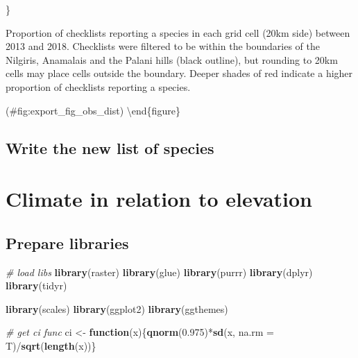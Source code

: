 \documentclass[]{article}
\newenvironment{Shaded}{}{}
\newcommand{\CommentTok}[1]{\textcolor[rgb]{0.38,0.63,0.69}{\textit{#1}}}
\newcommand{\ControlFlowTok}[1]{\textcolor[rgb]{0.00,0.44,0.13}{\textbf{#1}}}
\newcommand{\DataTypeTok}[1]{\textcolor[rgb]{0.56,0.13,0.00}{#1}}
\newcommand{\FloatTok}[1]{\textcolor[rgb]{0.25,0.63,0.44}{#1}}
\newcommand{\KeywordTok}[1]{\textcolor[rgb]{0.00,0.44,0.13}{\textbf{#1}}}
\newcommand{\NormalTok}[1]{#1}
\newcommand{\OperatorTok}[1]{\textcolor[rgb]{0.40,0.40,0.40}{#1}}
\newcommand{\StringTok}[1]{\textcolor[rgb]{0.25,0.44,0.63}{#1}}
\begin{document}
\}

\caption{Proportion of checklists reporting a species in each grid cell (20km side) between 2013 and 2018. Checklists were filtered to be within the boundaries of the Nilgiris, Anamalais and the Palani hills (black outline), but rounding to 20km cells may place cells outside the boundary. Deeper shades of red indicate a higher proportion of checklists reporting a species.}

(\#fig:export\_fig\_obs\_dist)
\textbackslash{}end\{figure\}

\hypertarget{write-the-new-list-of-species}{%
\subsection{Write the new list of species}\label{write-the-new-list-of-species}}

\begin{Shaded}
\end{Shaded}

\hypertarget{climate-in-relation-to-elevation}{%
\section{Climate in relation to elevation}\label{climate-in-relation-to-elevation}}

\hypertarget{prepare-libraries-2}{%
\subsection{Prepare libraries}\label{prepare-libraries-2}}

\begin{Shaded}
\begin{Highlighting}[]
\CommentTok{# load libs}
\KeywordTok{library}\NormalTok{(raster)}
\KeywordTok{library}\NormalTok{(glue)}
\KeywordTok{library}\NormalTok{(purrr)}
\KeywordTok{library}\NormalTok{(dplyr)}
\KeywordTok{library}\NormalTok{(tidyr)}

\KeywordTok{library}\NormalTok{(scales)}
\KeywordTok{library}\NormalTok{(ggplot2)}
\KeywordTok{library}\NormalTok{(ggthemes)}

\CommentTok{# get ci func}
\NormalTok{ci <-}\StringTok{ }\ControlFlowTok{function}\NormalTok{(x)\{}\KeywordTok{qnorm}\NormalTok{(}\FloatTok{0.975}\NormalTok{)}\OperatorTok{*}\KeywordTok{sd}\NormalTok{(x, }\DataTypeTok{na.rm =}\NormalTok{ T)}\OperatorTok{/}\KeywordTok{sqrt}\NormalTok{(}\KeywordTok{length}\NormalTok{(x))\}}
\end{Highlighting}
\end{Shaded}
\end{document}
